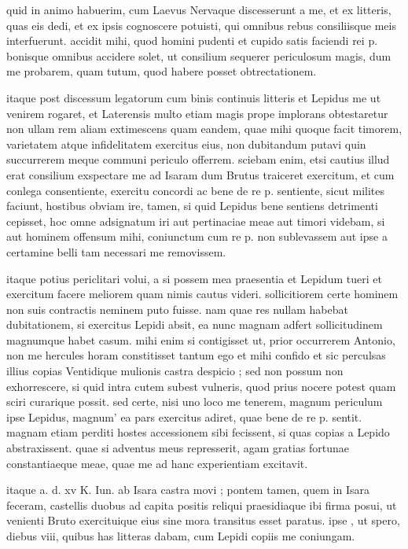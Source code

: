 


 quid in animo habuerim, cum Laevus Nervaque discesserunt a me, et ex litteris, quas eis dedi, et ex ipsis cognoscere potuisti, qui omnibus rebus consiliisque meis interfuerunt. accidit mihi, quod homini pudenti et cupido satis faciendi rei p. bonisque omnibus accidere solet, ut consilium sequerer periculosum magis, dum me probarem, quam tutum, quod habere posset obtrectationem.

 itaque post discessum legatorum cum binis continuis litteris et Lepidus me ut venirem rogaret, et Laterensis multo etiam magis prope implorans obtestaretur non ullam rem aliam extimescens quam eandem, quae mihi quoque facit timorem, varietatem atque infidelitatem exercitus eius, non dubitandum putavi quin succurrerem meque communi periculo offerrem. sciebam enim, etsi cautius illud erat consilium exspectare me ad Isaram dum Brutus traiceret exercitum, et cum conlega consentiente, exercitu concordi ac bene de re p. sentiente, sicut milites faciunt, hostibus obviam ire, tamen, si quid Lepidus bene sentiens detrimenti cepisset, hoc omne adsignatum iri aut pertinaciae meae aut timori videbam, si aut hominem offensum mihi, coniunctum cum re p. non sublevassem aut ipse a certamine belli tam necessari me removissem.

 itaque potius periclitari volui, a si possem mea praesentia et Lepidum tueri et exercitum facere meliorem quam nimis cautus videri. sollicitiorem certe hominem non suis contractis neminem puto fuisse. nam quae res nullam habebat dubitationem, si exercitus Lepidi absit, ea nunc magnam adfert sollicitudinem magnumque habet casum. mihi enim si contigisset ut, prior occurrerem Antonio, non me hercules horam constitisset tantum ego et mihi confido et sic perculsas illius copias Ventidique mulionis castra despicio ; sed non possum non exhorrescere, si quid intra cutem subest vulneris, quod prius nocere potest quam sciri curarique possit. sed certe, nisi uno loco me tenerem, magnum periculum ipse Lepidus, magnum' ea pars exercitus adiret, quae bene de re p. sentit. magnam etiam perditi hostes accessionem sibi fecissent, si quas copias a Lepido abstraxissent. quae si adventus meus represserit, agam gratias fortunae constantiaeque meae, quae me ad hanc experientiam excitavit.

 itaque a. d. xv K. Iun. ab Isara castra movi ; pontem tamen, quem in Isara feceram, castellis duobus ad capita positis reliqui praesidiaque ibi firma posui, ut venienti Bruto exercituique eius sine mora transitus esset paratus. ipse , ut spero, diebus viii, quibus has litteras dabam, cum Lepidi copiis me coniungam.
